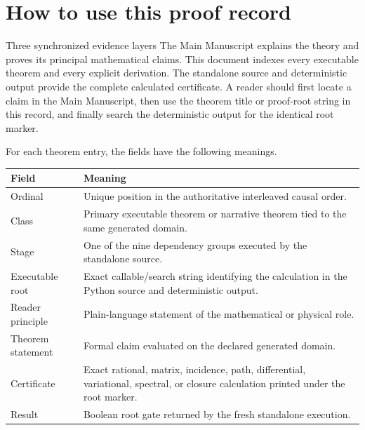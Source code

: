 \documentclass[11pt]{article}
\numberwithin{equation}{section}
\theoremstyle{remark}
\begin{document}
\tableofcontents
\clearpage

\section{How to use this proof record}
\begin{proofguide}{Three synchronized evidence layers}
The Main Manuscript explains the theory and proves its principal mathematical claims. This document indexes every executable theorem and every explicit derivation. The standalone source and deterministic output provide the complete calculated certificate. A reader should first locate a claim in the Main Manuscript, then use the theorem title or proof-root string in this record, and finally search the deterministic output for the identical root marker.
\end{proofguide}

For each theorem entry, the fields have the following meanings.
\begin{longtable}{p{3.4cm}p{10.5cm}}
\toprule Field&Meaning\\\midrule\endhead
Ordinal&Unique position in the authoritative interleaved causal order.\\
Class&Primary executable theorem or narrative theorem tied to the same generated domain.\\
Stage&One of the nine dependency groups executed by the standalone source.\\
Executable root&Exact callable/search string identifying the calculation in the Python source and deterministic output.\\
Reader principle&Plain-language statement of the mathematical or physical role.\\
Theorem statement&Formal claim evaluated on the declared generated domain.\\
Certificate&Exact rational, matrix, incidence, path, differential, variational, spectral, or closure calculation printed under the root marker.\\
Result&Boolean root gate returned by the fresh standalone execution.\\
\bottomrule
\end{longtable}
\end{document}
